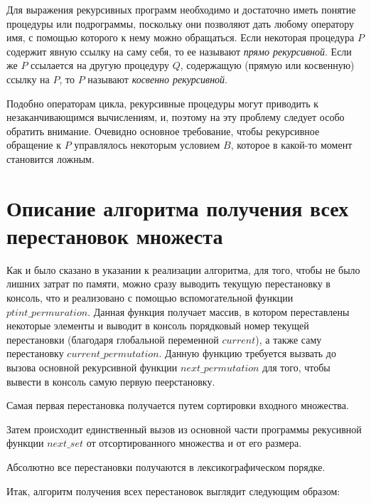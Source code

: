 \documentclass[bachelor, och, labwork]{shiza}
\begin{document}
Для выражения рекурсивных программ необходимо и достаточно иметь понятие
процедуры или подрограммы, поскольку они позволяют дать любому оператору имя,
с помощью которого к нему можно обращаться. Если некоторая процедура $P$
содержит явную ссылку на саму себя, то ее называют \textit{прямо рекурсивной}.
Если же $P$ ссылается на другую процедуру $Q$, содержащую (прямую или косвенную)
ссылку на $P$, то $P$ называют \textit{косвенно рекурсивной}.

Подобно операторам цикла, рекурсивные процедуры могут приводить к
незаканчивающимся вычислениям, и, поэтому на эту проблему следует особо обратить
внимание. Очевидно основное требование, чтобы рекурсивное обращение к $P$
управлялось некоторым условием $B$, которое в какой-то момент становится ложным.

\section{Описание алгоритма получения всех перестановок множеста}
Как и было сказано в указании к реализации алгоритма, для того, чтобы
не было лишних затрат по памяти, можно сразу выводить текущую перестановку
в консоль, что и реализовано с помощью вспомогательной функции $ptint\_permuration$.
Данная функция получает массив, в котором переставлены некоторые элементы
и выводит в консоль порядковый номер текущей перестановки (благодаря глобальной
переменной $current$), а также саму перестановку $current\_permutation$.
Данную функцию требуется вызвать до вызова основной рекурсивной функции 
$next\_permutation$ для того, чтобы вывести в консоль самую первую пеерстановку.

Самая первая перестановка получается путем сортировки входного множества.

Затем происходит единственный вызов из основной части программы рекусивной
функции $next\_set$ от отсортированного множества и от его размера.

Абсолютно все перестановки получаются в лексикографическом порядке.

Итак, алгоритм получения всех перестановок выглядит следующим образом:
\end{document}
